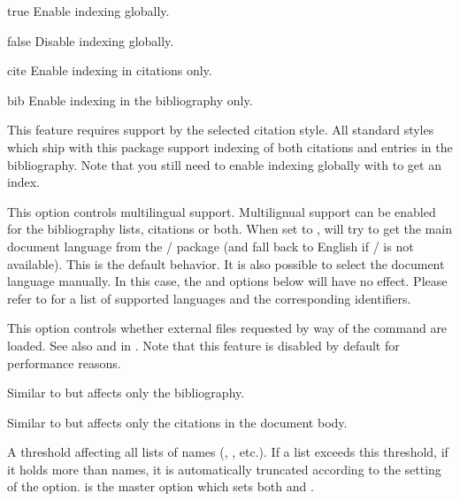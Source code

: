 \documentclass{ltxdockit}[2011/03/25]
\begin{document}
\begin{optionlist}
\begin{valuelist}
\item[true] Enable indexing globally.
\item[false] Disable indexing globally.
\item[cite] Enable indexing in citations only.
\item[bib] Enable indexing in the bibliography only.
\end{valuelist}

This feature requires support by the selected citation style. All standard styles which ship with this package support indexing of both citations and entries in the bibliography. Note that you still need to enable indexing globally with  to get an index.


This option controls multilingual support. Multilignual support can be enabled for the bibliography lists, citations or both. When set to ,  will try to get the main document language from the / package (and fall back to English if / is not available). This is the default behavior. It is also possible to select the document language manually. In this case, the  and  options below will have no effect. Please refer to  for a list of supported languages and the corresponding identifiers.


This option controls whether external files requested by way of the  command are loaded. See also  and  in . Note that this feature is disabled by default for performance reasons.


Similar to  but affects only the bibliography.


Similar to  but affects only the citations in the document body.


A threshold affecting all lists of names (, , etc.). If a list exceeds this threshold, \ie if it holds more than  names, it is automatically truncated according to the setting of the  option.  is the master option which sets both  and .


\end{optionlist}
\end{document}
